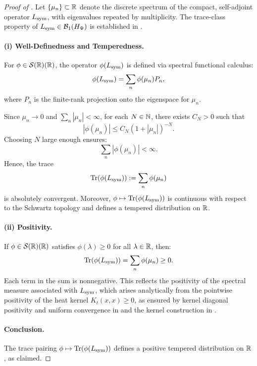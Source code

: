 \begin{proof}[Proof of ]
Let \( \{ \mu_n \} \subset \mathbb{R} \) denote the discrete spectrum of the compact, self-adjoint operator \( L_{\mathrm{sym}} \), with eigenvalues repeated by multiplicity. The trace-class property of \( L_{\mathrm{sym}} \in \mathcal{B}_1(H_{\Psi}) \) is established in .

\paragraph{(i) Well-Definedness and Temperedness.}
For \( \phi \in \mathcal{S}(\mathbb{R})(\mathbb{R}) \), the operator \( \phi(L_{\mathrm{sym}}) \) is defined via spectral functional calculus:
\[
\phi(L_{\mathrm{sym}}) = \sum_n \phi(\mu_n) P_n,
\]
where \( P_n \) is the finite-rank projection onto the eigenspace for \( \mu_n \).

Since \( \mu_n \to 0 \) and \( \sum_n |\mu_n| < \infty \), for each \( N \in \mathbb{N} \), there exists \( C_N > 0 \) such that
\[
|\phi(\mu_n)| \le C_N (1 + |\mu_n|)^{-N}.
\]
Choosing \( N \) large enough ensures:
\[
\sum_n |\phi(\mu_n)| < \infty.
\]
Hence, the trace
\[
\operatorname{Tr}(\phi(L_{\mathrm{sym}})) := \sum_n \phi(\mu_n)
\]
is absolutely convergent. Moreover, \( \phi \mapsto \operatorname{Tr}(\phi(L_{\mathrm{sym}})) \) is continuous with respect to the Schwartz topology and defines a tempered distribution on \( \mathbb{R} \).

\paragraph{(ii) Positivity.}
If \( \phi \in \mathcal{S}(\mathbb{R})(\mathbb{R}) \) satisfies \( \phi(\lambda) \ge 0 \) for all \( \lambda \in \mathbb{R} \), then:
\[
\operatorname{Tr}(\phi(L_{\mathrm{sym}})) = \sum_n \phi(\mu_n) \ge 0.
\]
Each term in the sum is nonnegative. This reflects the positivity of the spectral measure associated with \( L_{\mathrm{sym}} \), which arises analytically from the pointwise positivity of the heat kernel \( K_t(x,x) \ge 0 \), as ensured by kernel diagonal positivity and uniform convergence in  and the kernel construction in .

\paragraph{Conclusion.}
The trace pairing \( \phi \mapsto \operatorname{Tr}(\phi(L_{\mathrm{sym}})) \) defines a positive tempered distribution on \( \mathbb{R} \), as claimed.
\end{proof}
